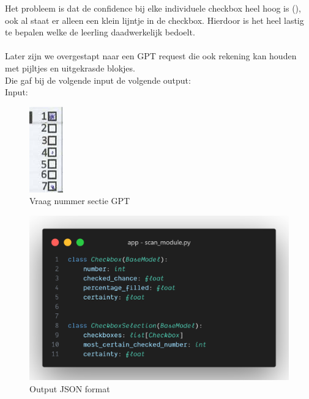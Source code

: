\documentclass[12pt]{article}
\begin{document}
\begin{multicols}{2}
Het probleem is dat de confidence bij elke individuele checkbox heel hoog is (), ook al staat er alleen een klein lijntje in de checkbox. Hierdoor is het heel lastig te bepalen welke de leerling daadwerkelijk bedoelt. \\
\\
Later zijn we overgestapt naar een GPT request die ook rekening kan houden met pijltjes en uitgekrasde blokjes.\\
Die gaf bij de volgende input de volgende output:\\
Input: 
\begin{figure}[H]
    \centering
    \includegraphics[width=0.33\linewidth]{./images/methoden/inscannen/sectie/checkbox/vraagnummer/section_selection_input.png}
    \caption{Vraag nummer sectie GPT}
    \label{fig:gpt-question-num}
\end{figure}
\begin{figure}[H]
    \centering
    \includegraphics[width=1\linewidth]{./images/methoden/inscannen/sectie/checkbox/vraagnummer/code-question-selector-format.png}
    \caption{Output JSON format}
    \label{fig:question-num-json}
\end{figure}


\end{multicols}
\end{document}
